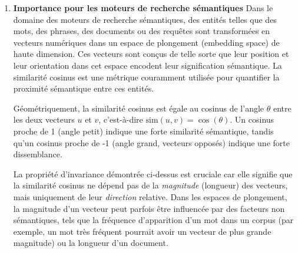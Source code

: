 \documentclass[11pt,a4paper]{report}
\begin{document}
\begin{enumerate}
  \textbf{Substitution et simplification :} Maintenant, nous substituons
  les expressions obtenues pour le numérateur et le dénominateur dans la
  formule de la similarité cosinus pour \(\alpha u\) et \(\beta v\) :
  \[ \text{sim}(\alpha u, \beta v) = \frac{\alpha \beta \langle u, v \rangle}{\alpha \beta \|u\| \|v\|} \]
  Puisque \(\alpha \in \mathbb{R}^{+*}\) et
  \(\beta \in \mathbb{R}^{+*}\), leur produit \(\alpha \beta\) est
  également un scalaire strictement positif. Nous pouvons donc diviser
  le numérateur et le dénominateur par \(\alpha \beta\) :
  \[ \text{sim}(\alpha u, \beta v) = \frac{\langle u, v \rangle}{\|u\| \|v\|} \]
  En comparant cette expression avec la définition de
  \(\text{sim}(u, v)\) de la partie 1, nous constatons qu'elles sont
  identiques. Ainsi, nous avons rigoureusement démontré que :
  \[ \text{sim}(u, v) = \text{sim}(\alpha u, \beta v) \] La similarité
  cosinus est bien invariante par mise à l'échelle par des scalaires
  strictement positifs.
\item
  \textbf{Importance pour les moteurs de recherche sémantiques} Dans le
  domaine des moteurs de recherche sémantiques, des entités telles que
  des mots, des phrases, des documents ou des requêtes sont transformées
  en vecteurs numériques dans un espace de plongement (embedding space)
  de haute dimension. Ces vecteurs sont conçus de telle sorte que leur
  position et leur orientation dans cet espace encodent leur
  signification sémantique. La similarité cosinus est une métrique
  couramment utilisée pour quantifier la proximité sémantique entre ces
  entités.

  Géométriquement, la similarité cosinus est égale au cosinus de l'angle
  \(\theta\) entre les deux vecteurs \(u\) et \(v\), c'est-à-dire
  \(\text{sim}(u, v) = \cos(\theta)\). Un cosinus proche de 1 (angle
  petit) indique une forte similarité sémantique, tandis qu'un cosinus
  proche de -1 (angle grand, vecteurs opposés) indique une forte
  dissemblance.

  La propriété d'invariance démontrée ci-dessus est cruciale car elle
  signifie que la similarité cosinus ne dépend pas de la
  \emph{magnitude} (longueur) des vecteurs, mais uniquement de leur
  \emph{direction} relative. Dans les espaces de plongement, la
  magnitude d'un vecteur peut parfois être influencée par des facteurs
  non sémantiques, tels que la fréquence d'apparition d'un mot dans un
  corpus (par exemple, un mot très fréquent pourrait avoir un vecteur de
  plus grande magnitude) ou la longueur d'un document.


\end{enumerate}
\end{document}
